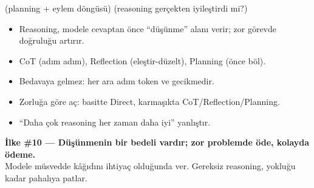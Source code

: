  (planning + eylem döngüsü) \tlsep {} \tlsep
{} \tlsep {} \tlsep {} (reasoning gerçekten iyileştirdi mi?)

\begin{itemize}
  \item Reasoning, modele cevaptan önce ``düşünme'' alanı verir; zor görevde doğruluğu artırır.
  \item CoT (adım adım), Reflection (eleştir-düzelt), Planning (önce böl).
  \item Bedavaya gelmez: her ara adım token ve gecikmedir.
  \item Zorluğa göre aç: basitte Direct, karmaşıkta CoT/Reflection/Planning.
  \item ``Daha çok reasoning her zaman daha iyi'' yanlıştır.
\end{itemize}

\begin{principlebox}
\textbf{İlke \#10 — Düşünmenin bir bedeli vardır; zor problemde öde, kolayda ödeme.}\\[4pt]
\normalsize Modele müsvedde kâğıdını ihtiyaç olduğunda ver. Gereksiz reasoning,
yokluğu kadar pahalıya patlar.
\end{principlebox}
